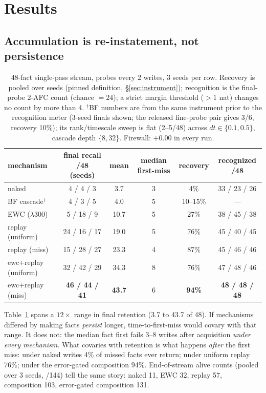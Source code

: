 \documentclass[11pt]{article}
\begin{document}
\section{Results}

\subsection{Accumulation is re-instatement, not persistence}\label{sec:reinstatement}

\begin{table}[t]
\centering\small
\begin{tabular}{lccccc}
\toprule
mechanism & final recall /48 (seeds) & mean & median first-miss & recovery & recognized /48 \\
\midrule
naked            & 4 / 4 / 3    & 3.7  & 3   & 4\%  & 33 / 23 / 26 \\
BF cascade$^\dagger$ & 4 / 3 / 5 & 4.0 & 5   & 10--15\% & --- \\
EWC ($\lambda$300) & 5 / 18 / 9 & 10.7 & 5   & 27\% & 38 / 45 / 38 \\
replay (uniform) & 24 / 16 / 17 & 19.0 & 5   & 76\% & 45 / 40 / 45 \\
replay (miss)    & 15 / 28 / 27 & 23.3 & 4   & 87\% & 45 / 46 / 46 \\
ewc+replay (uniform) & 32 / 42 / 29 & 34.3 & 8 & 76\% & 47 / 48 / 46 \\
ewc+replay (miss) & \textbf{46 / 44 / 41} & \textbf{43.7} & 6 & \textbf{94\%} & \textbf{48 / 48 / 48} \\
\bottomrule
\end{tabular}
\caption{48-fact single-pass stream, probes every 2 writes, 3 seeds per row. Recovery is pooled over
seeds (pinned definition, \S\ref{sec:instrument}); recognition is the final-probe 2-AFC count (chance
$=24$); a strict margin threshold ($>1$ nat) changes no count by more than 4. $^\dagger$BF numbers are
from the same instrument prior to the recognition meter (3-seed finals shown; the released fine-probe
pair gives 3/6, recovery 10\%); its rank/timescale sweep is flat (2--5/48) across
$dt\in\{0.1,0.5\}$, cascade depth $\{8,32\}$. Firewall: $+0.00$ in every run.}
\label{tab:main}
\end{table}

Table~\ref{tab:main} spans a $12\times$ range in final retention (3.7 to 43.7 of 48). If mechanisms
differed by making facts \emph{persist} longer, time-to-first-miss would covary with that range. It
does not: the median fact first fails 3--8 writes after acquisition \emph{under every mechanism}. What
covaries with retention is what happens \emph{after} the first miss: under naked writes 4\% of missed
facts ever return; under uniform replay 76\%; under the error-gated composition 94\%. End-of-stream
alive counts (pooled over 3 seeds, /144) tell the same story: naked 11, EWC 32, replay 57, composition
103, error-gated composition 131.
\end{document}
